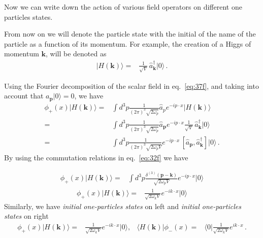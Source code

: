 Now we can write down the action of various field operators on different one particles states.
\begin{frame}
From now on we will denote the particle state with the initial of the name of the particle as a function of its momentum. For example, the creation of a Higgs of momentum $\mathbf{k}$, will be denoted as
\begin{align}
  |H(\mathbf{k})\rangle=&\frac{1}{\sqrt{V}}\, \widehat{a}^\dagger_{\mathbf{k}}|0\rangle\,.
\end{align}

Using the Fourier decomposition  of the scalar field in eq.~\eqref{eq:37f}, and taking into account that 
$a_{\mathbf{p}}|0\rangle=0$, we have
\begin{align}
   \phi_+(x)|H(\mathbf{k})\rangle=&\int d^3p \frac{1}{(2\pi)^3\sqrt{2\omega_{p} }}
\widehat{a}_{p} e^{-i p\cdot x }
|H(\mathbf{k})\rangle\nonumber\\
=&\int d^3p \frac{1}{(2\pi)^3\sqrt{2\omega_{p}}}
\widehat{a}_\mathbf{p} e^{-i p\cdot x }
\frac{1}{\sqrt{V}}\, \widehat{a}^\dagger_{\mathbf{k}}|0\rangle\nonumber\\
  =&\int d^3p \frac{1}{(2\pi)^3\sqrt{2\omega_{p}V}} e^{-i p\cdot x }
\, [\widehat{a}_{\mathbf{p}},\widehat{a}^\dagger_{\mathbf{k}}]|0\rangle\,.
\end{align}
By using the commutation relations in eq.~\eqref{eq:32f} we have

\begin{align}
\phi_+(x)|H(\mathbf{k})\rangle  
=&\int d^3p \frac{\delta^{(3)}(\mathbf{p}-\mathbf{k})}{\sqrt{2\omega_{p}V}}
 e^{-i p\cdot x }|0\rangle
\end{align}
\begin{align}
\phi_+(x)|H(\mathbf{k})\rangle  
=&\frac{1}{\sqrt{2\omega_{k}V}}e^{-i k\cdot x }|0\rangle
\end{align}
Similarly, we have  \emph{initial one-particles states} on left and \emph{initial one-particles states} on right
\begin{align}
  \label{eq:99f}
  \phi_+(x)|H(\mathbf{k})\rangle=&\frac{1}{\sqrt{2 \omega_k V}}e^{-i k\cdot x}|0\rangle,&
 \langle H(\mathbf{k})|\phi_-(x)=&\langle0|\frac{1}{\sqrt{2 \omega_k V}}e^{i k\cdot x} \,.
\end{align}
\end{frame}



